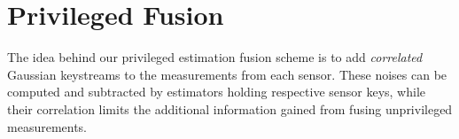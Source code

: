 \documentclass[conference]{IEEEtran}
\theoremstyle{definition}
\theoremstyle{remark}
\begin{document}
\section{Privileged Fusion}\label{sec:scheme}
The idea behind our privileged estimation fusion scheme is to add \textit{correlated} Gaussian keystreams to the measurements from each sensor. These noises can be computed and subtracted by estimators holding respective sensor keys, while their correlation limits the additional information gained from fusing unprivileged measurements. 

% 
% 
\end{document}
